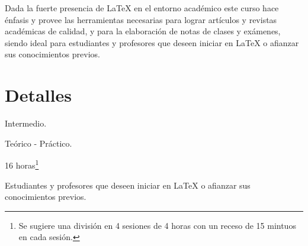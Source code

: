 \documentclass[12pt, twoside, a4paper, final]{article}
\begin{document}
        Dada la fuerte presencia de {\LaTeX} en el entorno académico este curso hace énfasis y provee las herramientas necesarias para lograr artículos y revistas académicas de calidad, y para la elaboración de notas de clases y exámenes, siendo ideal para estudiantes y profesores que deseen iniciar en {\LaTeX} o afianzar sus conocimientos previos.

    \section{Detalles}
        \begin{description}[style=nextline]
            \item[Nivel] Intermedio.
            \item[Método] Teórico - Práctico.
            \item[Duración] 16 horas\footnote{Se sugiere una división en 4 sesiones de 4 horas con un receso de 15 mintuos en cada sesión.}
            \item[Publico objetivo] Estudiantes y profesores que deseen iniciar en {\LaTeX} o afianzar sus conocimientos previos.
        \end{description}
\end{document}
